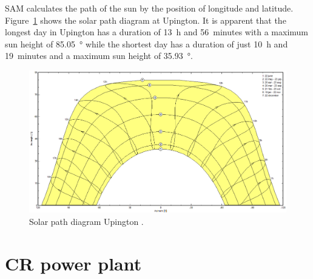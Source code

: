\newpage \noindent
SAM calculates the path of the sun by the position of longitude and latitude. Figure~\ref{SunPathUpington} shows the solar path diagram at Upington. It is apparent that the longest day in Upington has a duration of \SI{13}{h} and \SI{56}{minutes} with a maximum sun height of \SI{85.05}{\degree} while the shortest day has a duration of just \SI{10}{h} and \SI{19}{minutes} and a maximum sun height of \SI{35.93}{\degree}.

\begin{figure}[htbp]  
\centering
\includegraphics[width=0.95\linewidth]{FIG/SunPathUpington}
\caption[Solar path diagram for Upington.]{Solar path diagram Upington \cite{PVsystSA2015}.}\label{SunPathUpington}
\end{figure}
\pagebreak 
\section{CR power plant}
